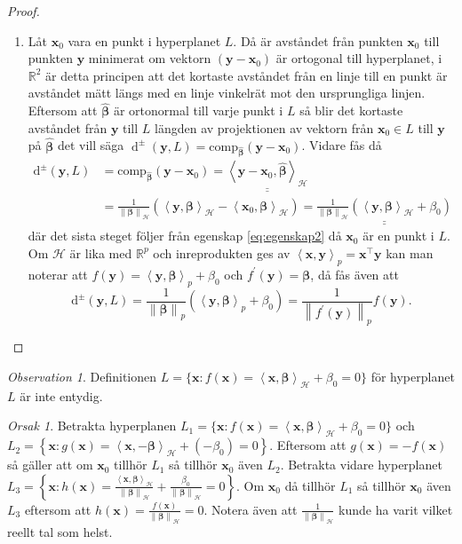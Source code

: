 \documentclass[a4paper, 12pt]{report}
\theoremstyle{definition}
\theoremstyle{remark}
\newtheorem*{rem}{Observation}
\newtheorem*{reas}{Orsak}
\newcommand{\bfbeta}{{\boldsymbol{\beta}}}
\newcommand{\bfx}{\mathbf{x}}
\newcommand{\bfy}{\mathbf{y}}
\newcommand{\llangle}{\left\langle}
\newcommand{\rrangle}{\right\rangle}
\newcommand{\sephyp}{\{ \mathbf{x} : f\left(\mathbf{x}\right)=\inner{\bfx}{\bfbeta}_\mathcal{H} + \beta_0=0\}}
\newcommand{\inner}[2]{\llangle #1, #2 \rrangle}
\newcommand{\hil}{\mathcal{H}}
\begin{document}
\begin{proof}
\begin{enumerate}
	\item Låt $\mathbf{x}_0$ vara en punkt i hyperplanet $L$.
	Då är avståndet från punkten $\bfx_0$ till punkten $\bfy$ minimerat om vektorn $\left(\bfy-\bfx_0\right)$ är ortogonal till hyperplanet, i $\mathbb{R}^2$ är detta principen att det kortaste avståndet från en linje till en punkt är avståndet mätt längs med en linje vinkelrät mot den ursprungliga linjen.
	Eftersom att $\widehat{\bfbeta}$ är ortonormal till varje punkt i $L$ så blir det kortaste avståndet från $\bfy$ till $L$ längden av projektionen av vektorn från $\bfx_0\in L$ till $\bfy$ på $\widehat{\bfbeta}$ det vill säga $\operatorname{d}^\pm \left(\mathbf{y}, L\right)=\operatorname{comp_{\widehat{\bfbeta}}} \left( \bfy - \mathbf{x}_0 \right)$.
	Vidare fås då
	\begin{align*}
		\operatorname{d^\pm} \left( \bfy, L \right) &= \operatorname{comp_{\widehat{\bfbeta}}} \left( \bfy - \mathbf{x}_0 \right)
		=\underline{\underline{ \inner{\bfy - \mathbf{x}_0}{\widehat{\bfbeta}}_\hil}}\\
		&= \frac{1}{\left\|\bfbeta
\right\|_\hil}\left(\inner{\bfy}{\bfbeta}_\hil - \inner{\bfx_0}{\bfbeta}_\hil\right)=\underline{\underline{\frac{1}{\left\|\bfbeta
\right\|_\hil}\left(\inner{\bfy}{\bfbeta}_\hil + \beta_0\right)}}
	\end{align*}
	där det sista steget följer från egenskap \ref{eq:egenskap2} då $\mathbf{x}_0$ är en punkt i $L$.
	Om $\hil$ är lika med $\mathbb{R}^p$ och inreprodukten ges av $\inner{\bfx}{\bfy}_p=\bfx^\intercal\bfy$ kan man noterar att $f\left(\bfy\right)=\inner{\bfy}{\bfbeta}_p+\beta_0$ och $f^\prime\left(\bfy\right)=\bfbeta$, då fås även att
	\begin{equation*}
		\operatorname{d^\pm} \left( \bfy, L \right)=\frac{1}{\left\|\bfbeta
\right\|_p}\left(\inner{\bfy}{\bfbeta}_p + \beta_0\right)=\frac{1}{\left\|f^\prime\left(\bfy\right)
\right\|_p}f\left(\bfy\right).
	\end{equation*}
	\qedhere
\end{enumerate}
\end{proof}

\begin{rem}
	Definitionen $L=\{ \mathbf{x} : f\left(\mathbf{x}\right)=\inner{\bfx}{\bfbeta}_\hil + \beta_0=0\}$ för hyperplanet $L$ är inte entydig.
\end{rem}
\begin{reas}
	Betrakta hyperplanen $L_1 = \sephyp$ och $L_2 = \left\{\mathbf{x}: g\left(\mathbf{x}\right)=\inner{\bfx}{-\bfbeta}_\hil + \left(-\beta_0\right) = 0\right\}$. Eftersom att $g\left(\mathbf{x}\right) = -f\left(\mathbf{x}\right)$ så gäller att om $\mathbf{x}_0$ tillhör $L_1$ så tillhör $\mathbf{x}_0$ även $L_2$.
	Betrakta vidare hyperplanet $L_3= \left\{\mathbf{x}: h\left(\mathbf{x}\right)=\frac{\inner{\bfx}{\bfbeta}_\hil}{\left\|\bfbeta
\right\|_\hil} + \frac{\beta_0}{\left\|\bfbeta
\right\|_\hil}=0\right\}$. Om $\mathbf{x}_0$ då tillhör $L_1$ så tillhör $\mathbf{x}_0$ även $L_3$ eftersom att $h\left(\mathbf{x}\right) = \frac{f\left(\mathbf{x}\right)}{\left\|\bfbeta
\right\|_\hil}=0$. Notera även att $\frac{1}{\left\|\bfbeta
\right\|_\hil}$ kunde ha varit vilket reellt tal som helst.
\end{reas}
\end{document}
